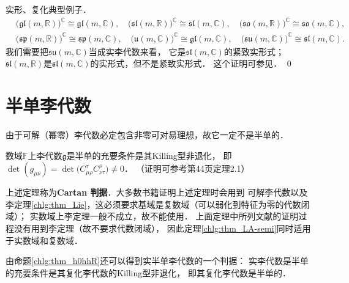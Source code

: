 \begin{example}\label{chlg:exam_real-complex}
    实形、复化典型例子．
    \begin{align*}
        &\bigl(\mathfrak{gl}(m,\mathbb{R}) \bigr)^{\mathbb{C}} \cong \mathfrak{gl}(m,\mathbb{C}), \quad
        \bigl(\mathfrak{sl}(m,\mathbb{R}) \bigr)^{\mathbb{C}} \cong \mathfrak{sl}(m,\mathbb{C}), \quad
        \bigl(\mathfrak{so}(m,\mathbb{R}) \bigr)^{\mathbb{C}} \cong \mathfrak{so}(m,\mathbb{C}), \\
        &\bigl(\mathfrak{sp}(m,\mathbb{R}) \bigr)^{\mathbb{C}} \cong \mathfrak{sp}(m,\mathbb{C}), \quad
        \bigl(\mathfrak{u}(m,\mathbb{C}) \bigr)^{\mathbb{C}} \cong \mathfrak{gl}(m,\mathbb{C}), \quad
        \bigl(\mathfrak{su}(m,\mathbb{C}) \bigr)^{\mathbb{C}} \cong \mathfrak{sl}(m,\mathbb{C}).
    \end{align*}
    我们需要把$\mathfrak{su}(m,\mathbb{C})$当成实李代数来看，
    它是$\mathfrak{sl}(m,\mathbb{C})$的紧致实形式；
    $\mathfrak{sl}(m,\mathbb{R})$是$\mathfrak{sl}(m,\mathbb{C})$的实形式，但不是紧致实形式．
    这个证明可参见\parencite[p.266]{wanzx-2013}． \qed
\end{example}




\section{半单李代数}


由于可解（幂零）李代数必定包含非零可对易理想，故它一定不是半单的．


\begin{theorem}\label{chlg:thm_LA-semi}
    数域$\mathbb{F}$上李代数$\mathfrak{g}$是半单的充要条件是其Killing型非退化，
    即$\det(g_{\mu\nu}) =\det\bigl( C^\tau_{\mu\rho} C^\rho_{\nu\tau}\bigr) \neq 0$．
    （证明可参考\parencite[\S 6.2]{serre-1992}第44页定理2.1）
\end{theorem}


上述定理称为{\heiti \bfseries Cartan 判据}．大多数书籍证明上述定理时会用到
可解李代数以及李定理\ref{chlg:thm_Lie}，这必须要求基域是复数域（可以弱化到特征为零的代数闭域）；
实数域上李定理一般不成立，故不能使用．
上面定理中所列文献的证明过程没有用到李定理（故不要求代数闭域），
因此定理\ref{chlg:thm_LA-semi}同时适用于实数域和复数域．

由命题\ref{chlg:thm_h0hhR}还可以得到实半单李代数的一个判据：
实李代数是半单的充要条件是其复化李代数的Killing型非退化，
即其复化李代数是半单的．



